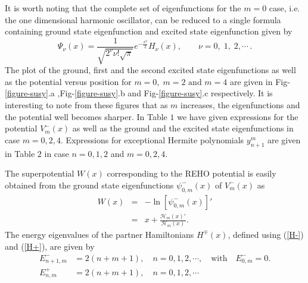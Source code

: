 \documentclass[11pt]{article}
\begin{document}
It is worth noting that the complete set of eigenfunctions for the $m = 0$ 
case, i.e. the one dimensional harmonic oscillator, can be reduced to a single formula containing ground state eigenfunction and excited state eigenfunction given by
\begin{equation*}
\Psi_{\nu}(x)=\frac{1}{\sqrt{2^{\nu}\nu!\sqrt{\pi}}} e^{-\frac{x^2}{2}} 
H_{\nu}(x) ,\qquad\nu=0,\;1,\;2,\cdots\,.
\end{equation*}
The plot of the ground, first and the second excited state eigenfunctions as 
well as the potential versus position for \( m=0,\;m=2 \text{ and }m=4 \) are 
given in Fig-\ref{figure-susy}.a ,Fig-\ref{figure-susy}.b and 
Fig-\ref{figure-susy}.c respectively. It is interesting to note from these 
figures that as $m$ increases, the eigenfunctions and the potential well 
becomes sharper. In Table $1$ we have given expressions for the potential
$V^{-}_{m}(x)$ as well as the ground and the excited state eigenfunctions 
in case $m = 0, 2,4$. Expressions for exceptional Hermite polynomials 
$y^{m}_{n+1}$ are given in Table $2$ in case $n = 0,1,2$ and $m = 0,2,4$.

The superpotential \( W(x) \) corresponding to the REHO potential is easily 
obtained from the ground state eigenfunctions \( \psi^-_{0,m}(x) \) of \( V^-_m(x) \) as
\begin{eqnarray}
W(x)&=&-\ln [\psi^-_{0,m}(x)]'\nonumber\\
&=& x+\frac{\mathcal{H}_m(x)'}{\mathcal{H}_m(x)}.
\end{eqnarray}
The energy eigenvalues of the partner Hamiltonians $H^{\mp}(x)$, defined using (\ref{H-}) and (\ref{H+}), are given by
\begin{align}
E^-_{n+1,m}&=2(n+m+1),\quad n=0,1,2,\cdots,\quad \text{with}\quad E^-_{0,m}=0.\\
E^+_{n,m}&=2(n+m+1),\quad n=0,1,2,\cdots
\end{align}
\end{document}
